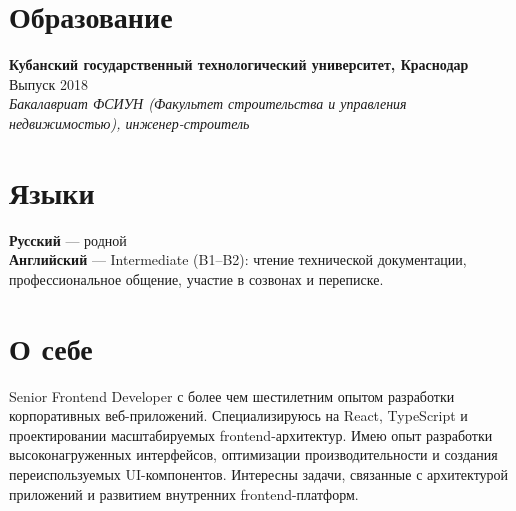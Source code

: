 \documentclass[10pt,a4paper]{article}
\begin{document}
\section*{Образование}
\noindent \small
\textbf{Кубанский государственный технологический университет, Краснодар} \hfill Выпуск 2018 \\
\textit{Бакалавриат ФСИУН (Факультет строительства и управления недвижимостью), инженер-строитель} 

\section*{Языки}
\noindent \small
\textbf{Русский} — родной \\
\textbf{Английский} — Intermediate (B1–B2): чтение технической документации, профессиональное общение, участие в созвонах и переписке.

\section*{О себе}
\noindent \small
Senior Frontend Developer с более чем шестилетним опытом разработки корпоративных веб-приложений. Специализируюсь на React, TypeScript и проектировании масштабируемых frontend-архитектур. Имею опыт разработки высоконагруженных интерфейсов, оптимизации производительности и создания переиспользуемых UI-компонентов. Интересны задачи, связанные с архитектурой приложений и развитием внутренних frontend-платформ.
\end{document}
